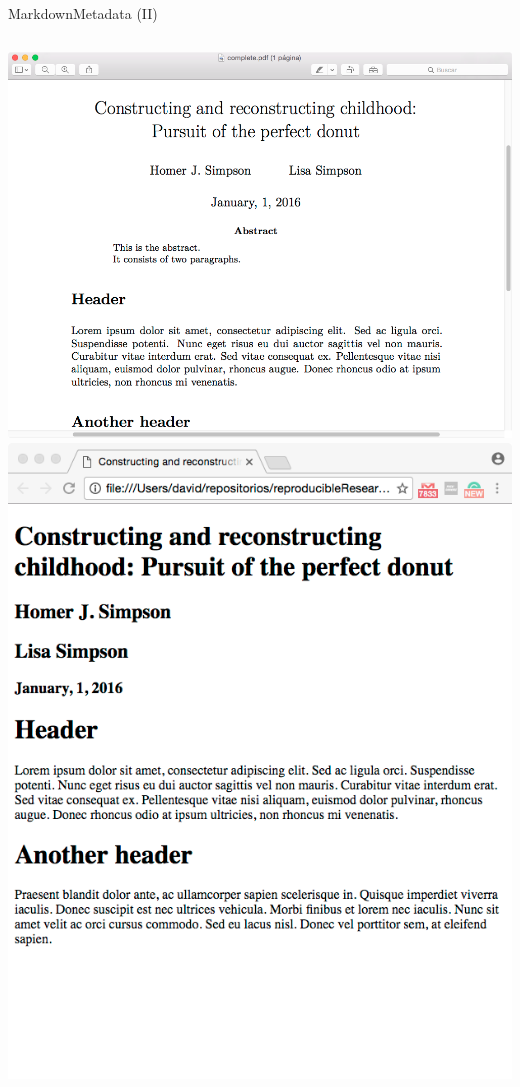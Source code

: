 \documentclass{beamer}
\begin{document}

\begin{frame}{Markdown}{Metadata (II)}
 \begin{columns}
     \column{0.31\dimexpr\paperwidth-10pt}
		\centering \includegraphics[width=\linewidth]{figs/metadataPDF.png} 
     \column{0.31\dimexpr\paperwidth-10pt}
		\centering \includegraphics[width=\linewidth]{figs/metadataHTML.png} 

\end{columns}
\end{frame}
\end{document}
